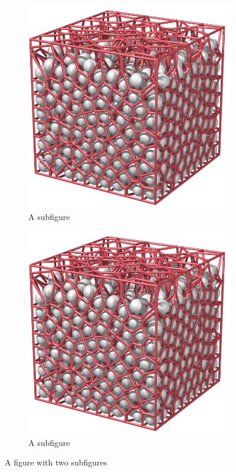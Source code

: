 \begin{figure}
\centering
\begin{subfigure}{.5\textwidth}
  \centering
  \includegraphics[width=.4\linewidth]{images/voronoi/import_AM2_A001.png}
  \caption{A subfigure}
  \label{fig:sub1}
\end{subfigure}%
\begin{subfigure}{.5\textwidth}
  \centering
  \includegraphics[width=.4\linewidth]{images/voronoi/import_AM2_A001.png}
  \caption{A subfigure}
  \label{fig:sub2}
\end{subfigure}
\caption{A figure with two subfigures}
\label{fig:test}
\end{figure}

